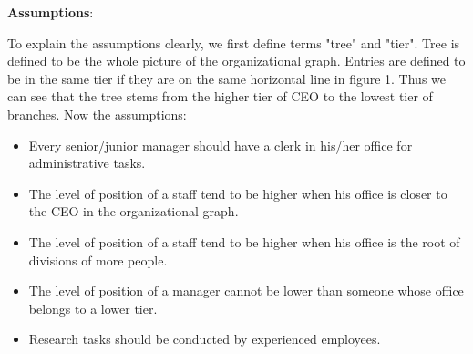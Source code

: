 \documentclass[tcn = 37075, sheet = true, abstract = true]{mcmthesis}
\begin{document}
\noindent \textbf{Assumptions}:

To explain the assumptions clearly, we first define terms "tree" and "tier". Tree is defined to be the whole picture of the organizational graph. Entries are defined to be in the same tier if they are on the same horizontal line in figure 1. Thus we can see that the tree stems from the higher tier of CEO to the lowest tier of branches. Now the assumptions:

\begin{itemize}
\item Every senior/junior manager should have a clerk in his/her office for administrative tasks.
\item The level of position of a staff tend to be higher when his office is closer to the CEO in the organizational graph.
\item The level of position of a staff tend to be higher when his office is the root of divisions of more people.
\item The level of position of a manager cannot be lower than someone whose office belongs to a lower tier.
\item Research tasks should be conducted by experienced employees.
\end{itemize}
\end{document}
